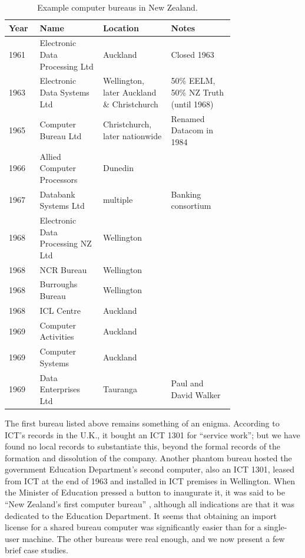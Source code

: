 \documentclass{IEEEcsmag}
\begin{document}
\begin{table}[h]
\begin{center}
\begin{tabular}{ |p{0.07\linewidth}|p{0.23\linewidth}|p{0.23\linewidth}|p{0.23\linewidth}<{\raggedright}| } 
 \hline
 Year & Name & Location & Notes\\ 
\hline
1961 & Electronic Data Processing Ltd & Auckland & Closed 1963\\\hline
1963 & Electronic Data Systems Ltd & Wellington, later Auckland \& Christchurch & 50\% EELM, 50\% NZ Truth (until 1968)\\\hline 
1965 & Computer Bureau Ltd & Christchurch, later nationwide & Renamed Datacom in 1984\\\hline
1966 & Allied Computer Processors & Dunedin & \\\hline
1967 & Databank Systems Ltd & multiple & Banking consortium\\\hline
1968 & Electronic Data Processing NZ Ltd& Wellington&\\\hline
1968 & NCR Bureau & Wellington &\\\hline
1968 & Burroughs Bureau & Wellington &\\\hline
1968 & ICL Centre& Auckland&\\\hline
1969 & Computer Activities& Auckland&\\\hline
1969 & Computer Systems& Auckland&\\\hline
1969 & Data Enterprises Ltd& Tauranga& Paul and David Walker\\\hline
\end{tabular}
\vspace{1ex}
\caption{\label{Bureaux}Example computer bureaus in New Zealand.}
\end{center}
\end{table}

The first bureau listed above remains something of an enigma. According to ICT’s records in the U.K., it bought an ICT 1301 for “service work”; but we have found no local records to substantiate this, beyond the formal records of the formation and dissolution of the company. Another phantom bureau hosted the government Education Department’s second computer, also an ICT 1301, leased from ICT at the end of 1963 and installed in ICT premises in Wellington. When the Minister of Education pressed a button to inaugurate it, it was said to be “New Zealand’s first computer bureau” \cite{NatEd1963}, although all indications are that it was dedicated to the Education Department. It seems that obtaining an import license for a shared bureau computer was significantly easier than for a single-user machine. The other bureaus were real enough, and we now present a few brief case studies.
\end{document}
